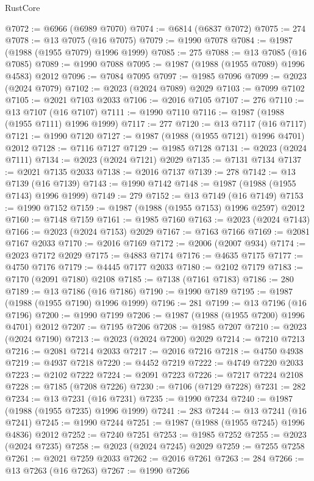 \begin{lexlean}{RustCore}
\begin{coremodule}
@7072 := @6966 (@6989 @7070)
@7074 := @6814 (@6837 @7072)
@7075 := 274
@7078 := @13 @7075 (@16 @7075)
@7079 := @1990 @7078
@7084 := @1987 (@1988 (@1955 @7079) @1996 @1999)
@7085 := 275
@7088 := @13 @7085 (@16 @7085)
@7089 := @1990 @7088
@7095 := @1987 (@1988 (@1955 @7089) @1996 @4583) @2012
@7096 := @7084 @7095
@7097 := @1985 @7096
@7099 := @2023 (@2024 @7079)
@7102 := @2023 (@2024 @7089) @2029
@7103 := @7099 @7102
@7105 := @2021 @7103 @2033
@7106 := @2016 @7105
@7107 := 276
@7110 := @13 @7107 (@16 @7107)
@7111 := @1990 @7110
@7116 := @1987 (@1988 (@1955 @7111) @1996 @1999)
@7117 := 277
@7120 := @13 @7117 (@16 @7117)
@7121 := @1990 @7120
@7127 := @1987 (@1988 (@1955 @7121) @1996 @4701) @2012
@7128 := @7116 @7127
@7129 := @1985 @7128
@7131 := @2023 (@2024 @7111)
@7134 := @2023 (@2024 @7121) @2029
@7135 := @7131 @7134
@7137 := @2021 @7135 @2033
@7138 := @2016 @7137
@7139 := 278
@7142 := @13 @7139 (@16 @7139)
@7143 := @1990 @7142
@7148 := @1987 (@1988 (@1955 @7143) @1996 @1999)
@7149 := 279
@7152 := @13 @7149 (@16 @7149)
@7153 := @1990 @7152
@7159 := @1987 (@1988 (@1955 @7153) @1996 @2597) @2012
@7160 := @7148 @7159
@7161 := @1985 @7160
@7163 := @2023 (@2024 @7143)
@7166 := @2023 (@2024 @7153) @2029
@7167 := @7163 @7166
@7169 := @2081 @7167 @2033
@7170 := @2016 @7169
@7172 := @2006 (@2007 @934)
@7174 := @2023 @7172 @2029
@7175 := @4883 @7174
@7176 := @4635 @7175
@7177 := @4750 @7176
@7179 := @4445 @7177 @2033
@7180 := @2102 @7179
@7183 := @7170 (@2091 @7180) @2108
@7185 := @7138 (@7161 @7183)
@7186 := 280
@7189 := @13 @7186 (@16 @7186)
@7190 := @1990 @7189
@7195 := @1987 (@1988 (@1955 @7190) @1996 @1999)
@7196 := 281
@7199 := @13 @7196 (@16 @7196)
@7200 := @1990 @7199
@7206 := @1987 (@1988 (@1955 @7200) @1996 @4701) @2012
@7207 := @7195 @7206
@7208 := @1985 @7207
@7210 := @2023 (@2024 @7190)
@7213 := @2023 (@2024 @7200) @2029
@7214 := @7210 @7213
@7216 := @2081 @7214 @2033
@7217 := @2016 @7216
@7218 := @4750 @4938
@7219 := @4937 @7218
@7220 := @4452 @7219
@7222 := @4749 @7220 @2033
@7223 := @2102 @7222
@7224 := @2091 @7223
@7226 := @7217 @7224 @2108
@7228 := @7185 (@7208 @7226)
@7230 := @7106 (@7129 @7228)
@7231 := 282
@7234 := @13 @7231 (@16 @7231)
@7235 := @1990 @7234
@7240 := @1987 (@1988 (@1955 @7235) @1996 @1999)
@7241 := 283
@7244 := @13 @7241 (@16 @7241)
@7245 := @1990 @7244
@7251 := @1987 (@1988 (@1955 @7245) @1996 @4836) @2012
@7252 := @7240 @7251
@7253 := @1985 @7252
@7255 := @2023 (@2024 @7235)
@7258 := @2023 (@2024 @7245) @2029
@7259 := @7255 @7258
@7261 := @2021 @7259 @2033
@7262 := @2016 @7261
@7263 := 284
@7266 := @13 @7263 (@16 @7263)
@7267 := @1990 @7266

\end{coremodule}
\end{lexlean}
